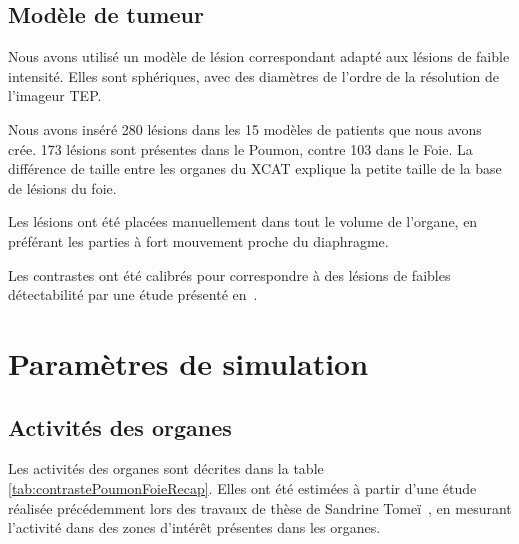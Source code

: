 \subsection{Modèle de tumeur}


Nous avons utilisé un modèle de lésion correspondant adapté aux lésions de faible intensité. Elles sont sphériques, avec des diamètres de l'ordre de la résolution de l'imageur TEP.

Nous avons inséré 280 lésions dans les 15 modèles de patients que nous avons crée. 173 lésions sont présentes dans le Poumon, contre 103 dans le Foie. La différence de taille entre les organes du XCAT explique la petite taille de la base de lésions du foie. 

Les lésions ont été placées manuellement dans tout le volume de l'organe, en préférant les parties à fort mouvement proche du diaphragme. 

Les contrastes ont été calibrés pour correspondre à des lésions de faibles détectabilité par une étude présenté en~\cite{lab:etudeDetect}.

\section{Paramètres de simulation}

\subsection{Activités des organes}

Les activités des organes sont décrites dans la table \ref{tab:contrastePoumonFoieRecap}. Elles ont été estimées à partir d'une étude réalisée précédemment lors des travaux de thèse de Sandrine Tomeï~\cite{tomei2008development}, en mesurant l'activité dans des zones d'intérêt présentes dans les organes.

